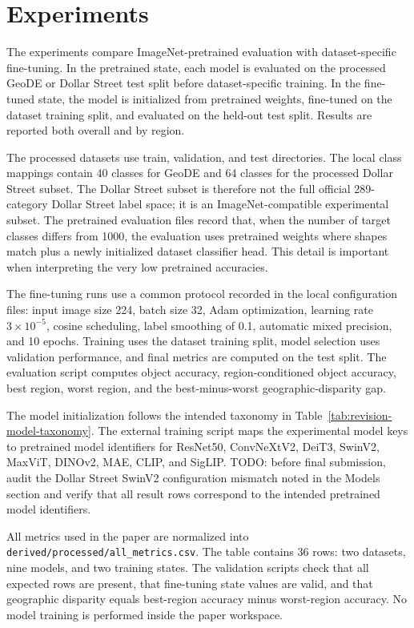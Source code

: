 \section{Experiments}

The experiments compare ImageNet-pretrained evaluation with dataset-specific fine-tuning. In the pretrained state, each model is evaluated on the processed GeoDE or Dollar Street test split before dataset-specific training. In the fine-tuned state, the model is initialized from pretrained weights, fine-tuned on the dataset training split, and evaluated on the held-out test split. Results are reported both overall and by region.

The processed datasets use train, validation, and test directories. The local class mappings contain 40 classes for GeoDE and 64 classes for the processed Dollar Street subset. The Dollar Street subset is therefore not the full official 289-category Dollar Street label space; it is an ImageNet-compatible experimental subset. The pretrained evaluation files record that, when the number of target classes differs from 1000, the evaluation uses pretrained weights where shapes match plus a newly initialized dataset classifier head. This detail is important when interpreting the very low pretrained accuracies.

The fine-tuning runs use a common protocol recorded in the local configuration files: input image size 224, batch size 32, Adam optimization, learning rate \(3\times10^{-5}\), cosine scheduling, label smoothing of 0.1, automatic mixed precision, and 10 epochs. Training uses the dataset training split, model selection uses validation performance, and final metrics are computed on the test split. The evaluation script computes object accuracy, region-conditioned object accuracy, best region, worst region, and the best-minus-worst geographic-disparity gap.

The model initialization follows the intended taxonomy in Table~\ref{tab:revision-model-taxonomy}. The external training script maps the experimental model keys to pretrained model identifiers for ResNet50, ConvNeXtV2, DeiT3, SwinV2, MaxViT, DINOv2, MAE, CLIP, and SigLIP. TODO: before final submission, audit the Dollar Street SwinV2 configuration mismatch noted in the Models section and verify that all result rows correspond to the intended pretrained model identifiers.

All metrics used in the paper are normalized into \texttt{derived/processed/all\_metrics.csv}. The table contains 36 rows: two datasets, nine models, and two training states. The validation scripts check that all expected rows are present, that fine-tuning state values are valid, and that geographic disparity equals best-region accuracy minus worst-region accuracy. No model training is performed inside the paper workspace.
